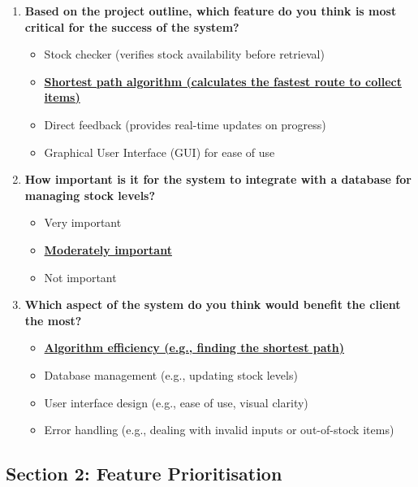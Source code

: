 \begin{enumerate}
    \item \textbf{Based on the project outline, which feature do you think is most critical for the success of the system?}
    \begin{itemize}
        \item Stock checker (verifies stock availability before retrieval)
        \item \textbf{\underline{Shortest path algorithm (calculates the fastest route to collect items)}}
        \item Direct feedback (provides real-time updates on progress)
        \item Graphical User Interface (GUI) for ease of use
    \end{itemize}

    \item \textbf{How important is it for the system to integrate with a database for managing stock levels?}
    \begin{itemize}
        \item Very important
        \item \textbf{\underline{Moderately important}}
        \item Not important
    \end{itemize}

    \item \textbf{Which aspect of the system do you think would benefit the client the most?}
    \begin{itemize}
        \item \textbf{\underline{Algorithm efficiency (e.g., finding the shortest path)}}
        \item Database management (e.g., updating stock levels)
        \item User interface design (e.g., ease of use, visual clarity)
        \item Error handling (e.g., dealing with invalid inputs or out-of-stock items)
    \end{itemize}

    
\end{enumerate}


\subsection*{Section 2: Feature Prioritisation}

